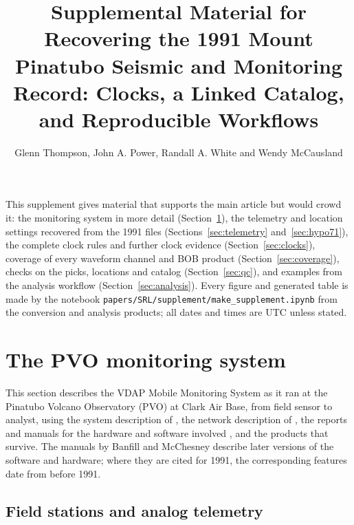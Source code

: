 \documentclass[11pt]{article}
\title{Supplemental Material for\\[4pt]
\large Recovering the 1991 Mount Pinatubo Seismic and Monitoring Record: Clocks, a Linked Catalog, and Reproducible Workflows}
\author{Glenn Thompson, John A. Power, Randall A. White and Wendy McCausland}
\date{}
\newcommand{\file}[1]{\texttt{#1}}
\begin{document}
\maketitle

\noindent This supplement gives material that supports the main article but would crowd it: the monitoring system in more detail (Section~\ref{sec:system}), the telemetry and location settings recovered from the 1991 files (Sections~\ref{sec:telemetry} and~\ref{sec:hypo71}), the complete clock rules and further clock evidence (Section~\ref{sec:clocks}), coverage of every waveform channel and BOB product (Section~\ref{sec:coverage}), checks on the picks, locations and catalog (Section~\ref{sec:qc}), and examples from the analysis workflow (Section~\ref{sec:analysis}). Every figure and generated table is made by the notebook \file{papers/SRL/supplement/make\_supplement.ipynb} from the conversion and analysis products; all dates and times are UTC unless stated.

\section{The PVO monitoring system}\label{sec:system}

This section describes the VDAP Mobile Monitoring System as it ran at the Pinatubo Volcano Observatory (PVO) at Clark Air Base, from field sensor to analyst, using the system description of \citet{Murray_1996}, the network description of \citet{Lockhart_1996}, the reports and manuals for the hardware and software involved \citep{Lee_1988,Tottingham_1989,Murray_1989,Murray_1990,Rogers_1995,Banfill_1999,Banfill_2003,McChesney_1999}, and the products that survive. The manuals by Banfill and McChesney describe later versions of the software and hardware; where they are cited for 1991, the corresponding features date from before 1991.

\subsection{Field stations and analog telemetry}
\end{document}
